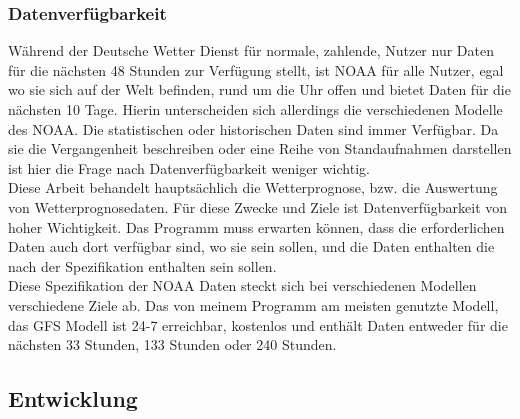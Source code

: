 \subsubsection{Datenverfügbarkeit} %
Während der Deutsche Wetter Dienst für normale, zahlende, Nutzer nur Daten
für die nächsten 48 Stunden zur Verfügung stellt, ist NOAA für alle Nutzer,
egal wo sie sich auf der Welt befinden, rund um die Uhr offen und bietet Daten
für die nächsten 10 Tage. Hierin unterscheiden sich allerdings die verschiedenen
Modelle des NOAA. Die statistischen oder historischen Daten sind immer Verfügbar.
Da sie die Vergangenheit beschreiben oder eine Reihe von Standaufnahmen darstellen
ist hier die Frage nach Datenverfügbarkeit weniger wichtig.\\
Diese Arbeit behandelt hauptsächlich die Wetterprognose, bzw. die Auswertung
von Wetterprognosedaten. Für diese Zwecke und Ziele ist Datenverfügbarkeit von
hoher Wichtigkeit. Das Programm muss erwarten können,
dass die erforderlichen Daten auch
dort verfügbar sind, wo sie sein sollen,
und die Daten enthalten die nach der
Spezifikation enthalten sein sollen.\\
Diese Spezifikation der NOAA Daten steckt sich bei verschiedenen Modellen
verschiedene Ziele ab. Das von meinem Programm am meisten genutzte Modell,
das GFS Modell ist 24-7 erreichbar,
kostenlos und enthält Daten entweder für die nächsten 33 Stunden,
133 Stunden oder 240 Stunden.

\subsection{Entwicklung} %

